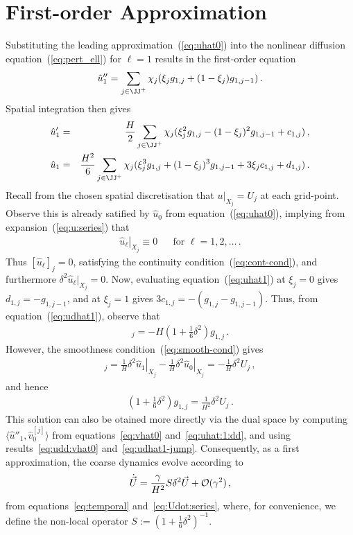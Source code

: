 \documentclass[12pt,a5paper]{article}
\begin{document}
\section{First-order Approximation}\label{sec:first-order}
Substituting the leading approximation~(\ref{eq:uhat0}) into the
nonlinear diffusion equation~(\ref{eq:pert_ell}) for $\ell=1$ results in
the first-order equation
\begin{eqnarray}
\hat{u}''_1 = \sum_{j\in\JJ^+}\chi_j(\xi_j g_{1,j}+(1-\xi_j)g_{1,j-1})\,.
\label{eq:uhat:1:dd}
\end{eqnarray}
Spatial integration then gives
\begin{eqnarray}
\hat{u}'_1 & = & \frac{H}{2}\sum_{j\in\JJ^+}\chi_j(\xi^2_j g_{1,j}
-(1-\xi_j)^2g_{1,j-1}+c_{1,j})\,,
\label{eq:udhat1}
\\
\hat{u}_1 & = & \frac{H^2}{6}\sum_{j\in\JJ^+}\chi_j(\xi^3_j g_{1,j}
+(1-\xi_j)^3g_{1,j-1}+3\xi_{j}c_{1,j}+d_{1,j})\,.
\label{eq:uhat1}
\end{eqnarray}
Recall from the chosen  spatial discretisation that $u|_{X_j}=U_{j}$ at each grid-point.
Observe this is already satified by $\hat{u}_0$ from equation~(\ref{eq:uhat0}), implying
from expansion~(\ref{eq:u:series}) that
\begin{eqnarray}
\left.\hat{u}_\ell\right|_{X_j}\equiv 0 && \mbox{for }\ell=1,2,\ldots\,.
\label{eq:u_ell_fixed}
\end{eqnarray}
Thus $[\hat{u}_\ell]_j=0$, satisfying the continuity 
condition~(\ref{eq:cont-cond}), and furthermore $\delta^2\hat{u}_\ell|_{X_j}=0$.
Now, evaluating equation~(\ref{eq:uhat1}) at $\xi_j=0$ gives $d_{1,j}=-g_{1,j-1}$,
and at $\xi_j=1$ gives $3c_{1,j}=-(g_{1,j}-g_{1,j-1})$.
Thus,  from equation~(\ref{eq:udhat1}), observe that
\begin{eqnarray}
[\hat{u}'_1]_j = -H\left(1+\frac{1}{6}\delta^2\right)g_{1,j}\,.
\end{eqnarray}
However, the smoothness condition~(\ref{eq:smooth-cond}) gives
\begin{eqnarray}
   [\hat{u}'_1]_j = 
\frac{1}{H}\left.\delta^{2}\hat{u}_1\right|_{X_j}
-\frac{1}{H}\left.\delta^{2}\hat{u}_0\right|_{X_j}
= -\frac{1}{H}\delta^{2}U_j\,,
\label{eq:udhat1-jump}
\end{eqnarray}
and hence
\begin{eqnarray}
\left(1+\frac{1}{6}\delta^2\right)g_{1,j} = \frac{1}{H^2}\delta^2U_j\,.
\label{eq:g1}
\end{eqnarray}
This solution can also be otained more directly via the dual space by computing $\langle\hat{u}''_1,\hat{v}_0^{[j]}\rangle$ from
equations~\eqref{eq:vhat0} and~\eqref{eq:uhat:1:dd}, and using results~\eqref{eq:udd:vhat0} and~\eqref{eq:udhat1-jump}.
Consequently, as a first approximation, the coarse dynamics evolve according to
\begin{eqnarray}
	\dot{\vec U} = \frac{\gamma}{H^2}S\delta^2\vec U + {\cal O}(\gamma^2)\,,
\label{eq:Udot:1}
\end{eqnarray}
from equations~\eqref{eq:temporal} and~\eqref{eq:Udot:series},
where, for convenience, we define the non-local operator $S:=(1+\frac{1}{6}\delta^2)^{-1}$.
\end{document}
